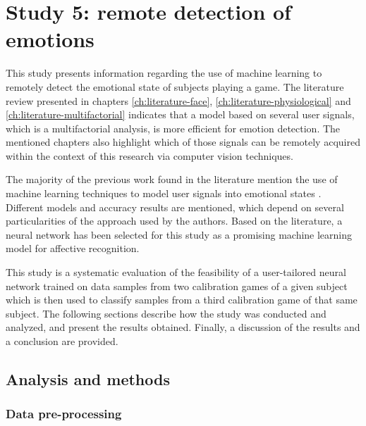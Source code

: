 \section{Study 5: remote detection of emotions}
\label{sec:experiment1-study5}

This study presents information regarding the use of machine learning to remotely detect the emotional state of subjects playing a game. The literature review presented in chapters \ref{ch:literature-face}, \ref{ch:literature-physiological} and \ref{ch:literature-multifactorial} indicates that a model based on several user signals, which is a multifactorial analysis, is more efficient for emotion detection. The mentioned chapters also highlight which of those signals can be remotely acquired within the context of this research via computer vision techniques.

The majority of the previous work found in the literature mention the use of machine learning techniques to model user signals into emotional states \parencite{moghimi2017affective}. Different models and accuracy results are mentioned, which depend on several particularities of the approach used by the authors. Based on the literature, a neural network has been selected for this study as a promising machine learning model for affective recognition.

This study is a systematic evaluation of the feasibility of a user-tailored neural network trained on data samples from two calibration games of a given subject which is then used to classify samples from a third calibration game of that same subject. The following sections describe how the study was conducted and analyzed, and present the results obtained. Finally, a discussion of the results and a conclusion are provided.

\subsection{Analysis and methods}
\label{sec:experiment1-study5-method}

\subsubsection{Data pre-processing}

